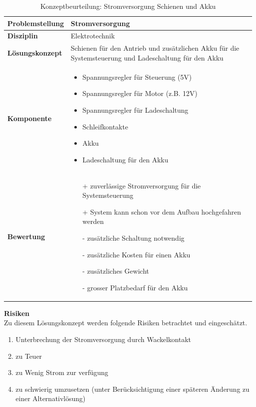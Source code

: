 \documentclass[../../main.tex]{subfiles}
\begin{document}
    \begin{flushleft}
        \begin{table}[H]
        \begin{tabular}{ | l | p{11cm} |}
        \hline
        \textbf{Problemstellung} & Stromversorgung \\ \hline
        \textbf{Disziplin} & Elektrotechnik \\ \hline
        \textbf{Lösungskonzept} & Schienen für den Antrieb und zusätzlichen Akku für die Systemsteuerung und Ladeschaltung für den Akku\\ \hline
        \textbf{Komponente} & \begin{itemize}
            \item Spannungsregler für Steuerung (5V)
            \item Spannungsregler für Motor (z.B. 12V)
            \item Spannungsregler für Ladeschaltung
            \item Schleifkontakte
            \item Akku
            \item Ladeschaltung für den Akku
            \end{itemize}\\ \hline
        \textbf{Bewertung} &  \begin{itemize}
                                \item[+] zuverlässige Stromversorgung für die Systemsteuerung
                                \item[+] System kann schon vor dem Aufbau hochgefahren werden 
                                \item[-] zusätzliche Schaltung notwendig 
                                \item[-] zusätzliche Kosten für einen Akku
                                \item[-] zusätzliches Gewicht
                                \item[-] grosser Platzbedarf für den Akku 
                              \end{itemize} \\ \hline
        \end{tabular}
        \caption{Konzeptbeurteilung: Stromversorgung Schienen und Akku}
        \label{tab:strom_konzept_schienen_und_akku}
    \end{table}
    \end{flushleft}

    \textbf{Risiken}\\
    Zu diesem Lösungskonzept werden folgende Risiken betrachtet und eingeschätzt.
    \begin{enumerate}[I]
        \item Unterbrechung der Stromversorgung durch Wackelkontakt
        \item zu Teuer
        \item zu Wenig Strom zur verfügung
        \item zu schwierig umzusetzen (unter Berücksichtigung einer späteren Änderung zu einer Alternativlösung)
    \end{enumerate}
\end{document}
